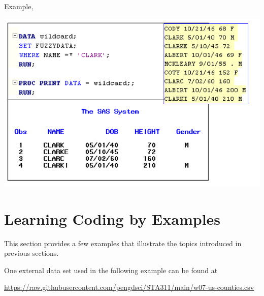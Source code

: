 \documentclass[
]{book}
\begin{document}
Example,

\begin{center}\includegraphics[width=1\linewidth]{img09/w09-SOUND-EXP} \end{center}

\hypertarget{learning-coding-by-examples-5}{%
\section{Learning Coding by Examples}\label{learning-coding-by-examples-5}}

This section provides a few examples that illustrate the topics introduced in previous sections.

One external data set used in the following example can be found at

\url{https://raw.githubusercontent.com/pengdsci/STA311/main/w07-us-counties.csv}
\end{document}
